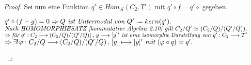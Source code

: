 \documentclass[10pt,a4paper]{report}
\newcommand{\functionfront}[3]{\nolinebreak{#1:#2 \longrightarrow #3}}
\newcommand{\function}[5]{\nolinebreak{#1:#2 \longrightarrow #3 \, , \, #4 \longmapsto #5}}
\newcommand*{\defeq}{\mathrel{\vcenter{\baselineskip0.5ex \lineskiplimit0pt
                     \hbox{\scriptsize.}\hbox{\scriptsize.}}}%
                     =}
\newcommand{\kernel}[1]{kern(#1)}
\begin{document}
\begin{proof}
Sei nun eine Funktion $q' \in Hom_{\mathcal{A}}(C_2,T')$ mit $q' \circ f = q' \circ$ gegeben.
\begin{spacing}{1.5}
$q' \circ (f - g) = 0 \Rightarrow Q\textit{ ist Untermodul von }Q' \defeq \kernel{q'}.$\\
$\textit{Nach HOMOMORPHIESATZ [kommutative Algebra 2.10] gilt } \nolinebreak{C_2/Q' \simeq (C_2/Q)/(Q'/Q))}.$\\
$\Rightarrow \textit{für } \function{q'}{C_2}{(C_2/Q)/(Q'/Q))}{y}{[y]'} \textit{ ist eine isomorphw Darstellung von } \functionfront{q'}{C_2}{T'}$\\
$\Rightarrow \exists ! \function{\varphi}{C_2/Q}{(C_2/Q)/(Q'/Q)}{[y]}{[y]'}\textit{ mit }(\varphi \circ q) = q'.$
\end{spacing}
\end{proof}
\end{document}
